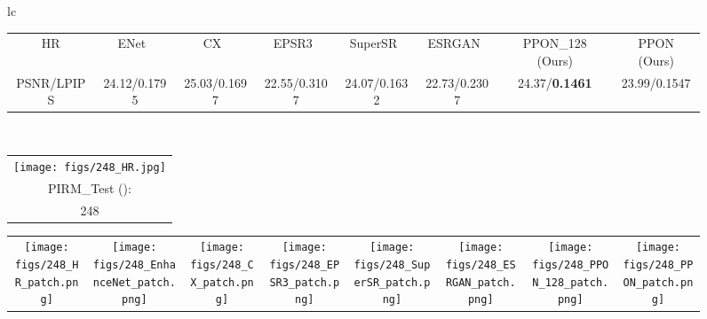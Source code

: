 \documentclass[preprint]{elsarticle}
\begin{document}
\begin{figure*}[htpb]
{\begin{tabular}{lc}
\begin{adjustbox}{valign=t}
\begin{tabular}{cccccccc}
					HR & \hspace{-3mm} ENet~\cite{EnhanceNet} & \hspace{-3mm} CX~\cite{CX} & \hspace{-3mm} EPSR3~\cite{EPSR} & 
					SuperSR~\cite{ESRGAN} & \hspace{-3mm} ESRGAN~\cite{ESRGAN} & \hspace{-3mm} PPON\_128 (Ours) & \hspace{-3mm} PPON (Ours) \\
					
					PSNR/LPIPS & \hspace{-3mm} 24.12/0.1795 & \hspace{-3mm} 25.03/0.1697 & \hspace{-3mm} 22.55/0.3107 &
					24.07/0.1632 & \hspace{-3mm} 22.73/0.2307 & \hspace{-3mm} 24.37/\textbf{0.1461} & \hspace{-3mm} 23.99/0.1547 \\
				\end{tabular}
			\end{adjustbox}
			\\
			\begin{adjustbox}{valign=t}
				\scriptsize
				\begin{tabular}{c}
					\texttt{[image: figs/248\_HR.jpg]} \\
					PIRM\_Test (): \\
					248 \\
				\end{tabular}
			\end{adjustbox}
			\hspace{-3mm}
			\begin{adjustbox}{valign=t}
				\scriptsize
				\begin{tabular}{cccccccc}
					\texttt{[image: figs/248\_HR\_patch.png]} &
					\hspace{-3mm}
					\texttt{[image: figs/248\_EnhanceNet\_patch.png]} &
					\hspace{-3mm}
					\texttt{[image: figs/248\_CX\_patch.png]} &
					\hspace{-3mm}
					\texttt{[image: figs/248\_EPSR3\_patch.png]} &
					\hspace{-3mm}					
					\texttt{[image: figs/248\_SuperSR\_patch.png]} &
					\hspace{-3mm}
					\texttt{[image: figs/248\_ESRGAN\_patch.png]} &
					\hspace{-3mm}
					\texttt{[image: figs/248\_PPON\_128\_patch.png]} &
					\hspace{-3mm}
					\texttt{[image: figs/248\_PPON\_patch.png]} \\
					

\end{tabular}
\end{adjustbox}
\end{tabular}}
\end{figure*}
\end{document}
